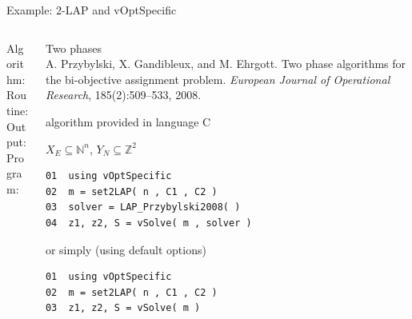 \documentclass[10pt,xcolor=dvipsnames]{beamer}
\newcommand{\mN}{\mathbb{N}}
\newcommand{\Z}{\mathbb{Z}}
\begin{document}
\begin{frame}[fragile=singleslide]{Example: 2-LAP and vOptSpecific}

\vspace{5mm}
\begin{columns}
%
\begin{column}{0.15\textwidth}
Algorithm: \\
\vspace{15mm}
Routine:\\  
\vspace{2mm}
Output: \\
\vspace{6mm}
Program:
\vspace{33mm}
\end{column}
\begin{column}{0.85\textwidth}
         Two phases  \vspace{1mm}\\
         {\footnotesize A. Przybylski, X. Gandibleux, and M. Ehrgott. Two phase algorithms for the bi-objective assignment problem.
         \textit{European Journal of Operational Research}, 185(2):509--533, 2008.\\}
\medskip

         algorithm provided in language C
\medskip

$X_E \subseteq \mN^n$, $Y_N \subseteq \Z^2$
\vspace{3mm}

{\footnotesize
\begin{verbatim}
01  using vOptSpecific   
02  m = set2LAP( n , C1 , C2 )
03  solver = LAP_Przybylski2008( ) 
04  z1, z2, S = vSolve( m , solver ) 
\end{verbatim}
}          
or simply (using default options)
{\footnotesize
\begin{verbatim}
01  using vOptSpecific   
02  m = set2LAP( n , C1 , C2 )
03  z1, z2, S = vSolve( m ) 
\end{verbatim}
}          

\end{column}
%
\end{columns}         

\end{frame}
\end{document}
